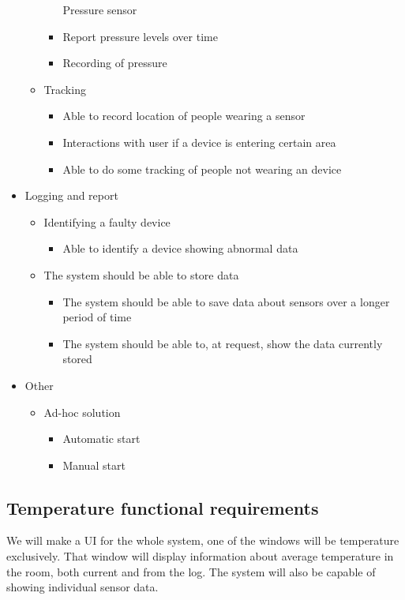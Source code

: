\documentclass[../document]{subfiles}
\begin{document}
\begin{itemize}
\begin{itemize}
\begin{itemize}
			Pressure sensor
			\item
			Report pressure levels over time
			\item
			Recording of pressure
		\end{itemize}
		\item
		Tracking
		\begin{itemize}
			\item
			Able to record location of people wearing a sensor
			\item
			Interactions with user if a device is entering certain area
			\item
			Able to do some tracking of people not wearing an device
		\end{itemize}
	\end{itemize}
	\item
	Logging and report
	\begin{itemize}
		\item
		Identifying a faulty device
		\begin{itemize}
			\item
			Able to identify a device showing abnormal data
		\end{itemize}
		\item
		The system should be able to store data
		\begin{itemize}
			\item
			The system should be able to save data about sensors over a longer period of time
			\item
			The system should be able to, at request, show the data currently stored
		\end{itemize}
	\end{itemize}
	\item
	Other
	\begin{itemize}
		\item
		Ad-hoc solution
		\begin{itemize}
			\item
			Automatic start
			\item
			Manual start
		\end{itemize}
	\end{itemize}
\end{itemize}

\subsection{Temperature functional requirements}
We will make a UI for the whole system, one of the windows will be temperature exclusively. That window will display information about average temperature in the room, both current and from the log. The system will also be capable of showing individual sensor data.
\end{document}
